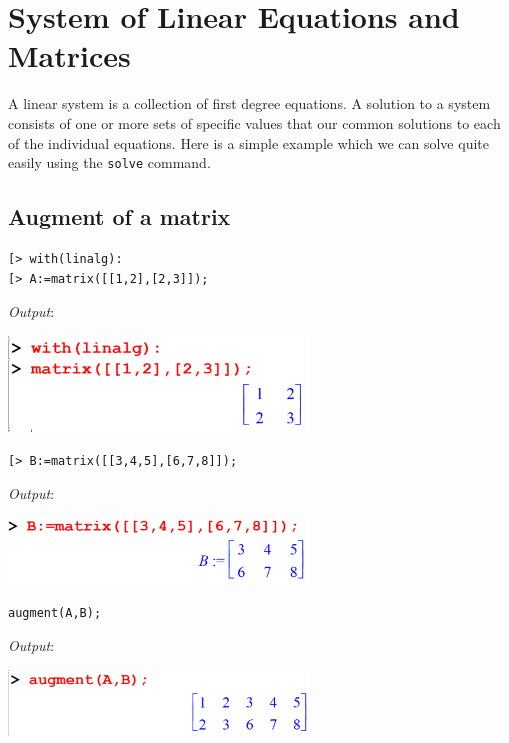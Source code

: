 \documentclass[
]{book}
\theoremstyle{definition}
\theoremstyle{definition}
\theoremstyle{definition}
\theoremstyle{definition}
\theoremstyle{remark}
\begin{document}
\chapter{System of Linear Equations and Matrices}\label{system-of-linear-equations-and-matrices}

A linear system is a collection of first degree equations. A solution to a system consists of one or more sets of specific values that our common solutions to each of the individual equations. Here is a simple example which we can solve quite easily using the \texttt{solve} command.

\section{Augment of a matrix}\label{augment-of-a-matrix}

\begin{verbatim}
[> with(linalg):
[> A:=matrix([[1,2],[2,3]]);
\end{verbatim}

\emph{Output}:

\includegraphics[width=0.6\textwidth,height=\textheight]{figures/Lesson 5/fig1.png}

\begin{verbatim}
[> B:=matrix([[3,4,5],[6,7,8]]);
\end{verbatim}

\emph{Output}:

\includegraphics[width=0.6\textwidth,height=\textheight]{figures/Lesson 5/fig2.png}

\begin{verbatim}
augment(A,B);
\end{verbatim}

\emph{Output}:

\includegraphics[width=0.6\textwidth,height=\textheight]{figures/Lesson 5/fig3.png}
\end{document}
